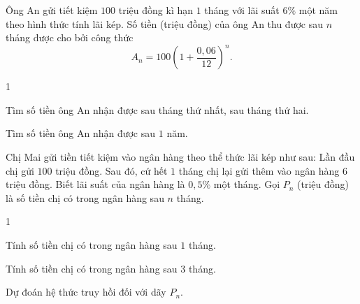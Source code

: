 \begin{baitap}
	Ông An gửi tiết kiệm $ 100 $ triệu đồng kì hạn $ 1 $ tháng với lãi suất $6 \%$ một năm theo hình thức tính lãi kép. Số tiền (triệu đồng) của ông An thu được sau $n$ tháng được cho bởi công thức
	$$A_n=100\left(1+\dfrac{0,06}{12}\right)^n.$$
	\begin{enumEX}{1}
		\item Tìm số tiền ông An nhận được sau tháng thứ nhất, sau tháng thứ hai.
		\item Tìm số tiền ông An nhận được sau $ 1 $ năm.
	\end{enumEX}
\end{baitap}


\begin{baitap}
	Chị Mai gửi tiền tiết kiệm vào ngân hàng theo thể thức lãi kép như sau: Lần đầu chị gửi $ 100 $ triệu đồng. Sau đó, cứ hết $ 1 $ tháng chị lại gửi thêm vào ngân hàng $ 6 $ triệu đồng. Biết lãi suất của ngân hàng là $0,5 \%$ một tháng. Gọi $P_n$ (triệu đồng) là số tiền chị có trong ngân hàng sau $n$ tháng.
	\begin{enumEX}{1}
		\item Tính số tiền chị có trong ngân hàng sau $ 1 $ tháng.
		\item Tính số tiền chị có trong ngân hàng sau $ 3 $ tháng.
		\item Dự đoán hệ thức truy hồi đối với dãy $P_n$.
	\end{enumEX}
\end{baitap}



